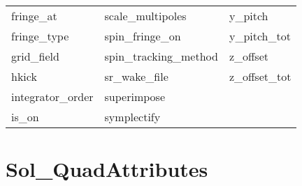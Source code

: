 \begin{tabular}{lll}
fringe_at                   & scale_multipoles            & y_pitch                     \\
fringe_type                 & spin_fringe_on              & y_pitch_tot                 \\
grid_field                  & spin_tracking_method        & z_offset                    \\
hkick                       & sr_wake_file                & z_offset_tot                \\
integrator_order            & superimpose                 &                             \\
is_on                       & symplectify                 &                             \\
 \bottomrule
 \end{tabular}
 \vfill
 
 \section{Sol_QuadAttributes}
 \label{s:list.sol.quad}
 
